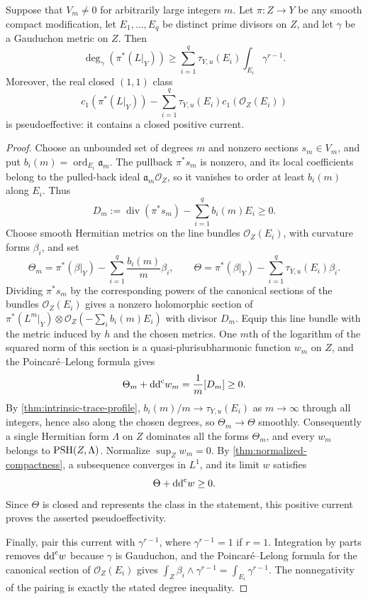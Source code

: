 \begin{theorem}\label{thm:gauduchon-trace-section-obstruction}
Suppose that $V_m\neq0$ for arbitrarily large integers $m$. Let $\pi\colon Z\to Y$ be any smooth compact modification, let $E_1,\ldots,E_q$ be distinct prime divisors on $Z$, and let $\gamma$ be a Gauduchon metric on $Z$. Then
\[
 \deg_\gamma(\pi^*(L|_Y))
 \geq\sum_{i=1}^q\tau_{Y,u}(E_i)\int_{E_i}\gamma^{r-1}.
\]
Moreover, the real closed $(1,1)$ class
\[
 c_1(\pi^*(L|_Y))-
       \sum_{i=1}^q\tau_{Y,u}(E_i)c_1(\mathcal O_Z(E_i))
\]
is pseudoeffective: it contains a closed positive current.
\end{theorem}
\begin{proof}
Choose an unbounded set of degrees $m$ and nonzero sections $s_m\in V_m$, and put $b_i(m)=\operatorname{ord}_{E_i}\mathfrak a_m$. The pullback $\pi^*s_m$ is nonzero, and its local coefficients belong to the pulled-back ideal $\mathfrak a_m\mathcal O_Z$, so it vanishes to order at least $b_i(m)$ along $E_i$. Thus
\[
 D_m:=\operatorname{div}(\pi^*s_m)-\sum_{i=1}^q b_i(m)E_i
 \geq0.
\]
Choose smooth Hermitian metrics on the line bundles $\mathcal O_Z(E_i)$, with curvature forms $\beta_i$, and set
\[
 \Theta_m=\pi^*(\beta|_Y)-\sum_{i=1}^q\frac{b_i(m)}m\beta_i,
 \qquad
 \Theta=\pi^*(\beta|_Y)-\sum_{i=1}^q\tau_{Y,u}(E_i)\beta_i.
\]
Dividing $\pi^*s_m$ by the corresponding powers of the canonical sections of the bundles $\mathcal O_Z(E_i)$ gives a nonzero holomorphic section of $\pi^*(L^m|_Y)\otimes\mathcal O_Z(-\sum_i b_i(m)E_i)$ with divisor $D_m$. Equip this line bundle with the metric induced by $h$ and the chosen metrics. One $m$th of the logarithm of the squared norm of this section is a quasi-plurisubharmonic function $w_m$ on $Z$, and the Poincar\'e--Lelong formula gives
\[
 \Theta_m+\mathrm{dd}^{\mathrm{c}} w_m=\frac1m[D_m]\geq0.
\]
By \cref{thm:intrinsic-trace-profile}, $b_i(m)/m\to\tau_{Y,u}(E_i)$ as $m\to\infty$ through all integers, hence also along the chosen degrees, so $\Theta_m\to\Theta$ smoothly. Consequently a single Hermitian form $\Lambda$ on $Z$ dominates all the forms $\Theta_m$, and every $w_m$ belongs to $\mathrm{PSH}(Z,\Lambda)$. Normalize $\sup_Zw_m=0$. By \cref{thm:normalized-compactness}, a subsequence converges in $L^1$, and its limit $w$ satisfies
\[
 \Theta+\mathrm{dd}^{\mathrm{c}} w\geq0.
\]
Since $\Theta$ is closed and represents the class in the statement, this positive current proves the asserted pseudoeffectivity.

Finally, pair this current with $\gamma^{r-1}$, where $\gamma^{r-1}=1$ if $r=1$. Integration by parts removes $\mathrm{dd}^{\mathrm{c}} w$ because $\gamma$ is Gauduchon, and the Poincar\'e--Lelong formula for the canonical section of $\mathcal O_Z(E_i)$ gives $\int_Z\beta_i\wedge\gamma^{r-1}=\int_{E_i}\gamma^{r-1}$. The nonnegativity of the pairing is exactly the stated degree inequality.
\end{proof}

